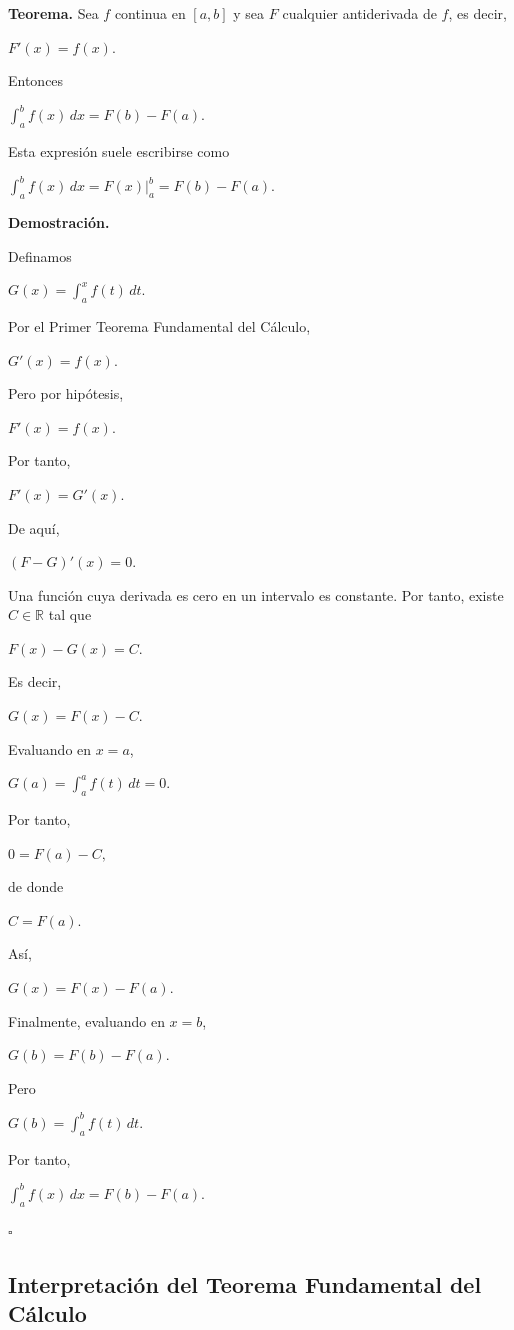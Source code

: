 \documentclass[12pt]{article}
\begin{document}
\textbf{Teorema.}
Sea $f$ continua en $[a,b]$ y sea $F$ cualquier antiderivada de $f$, es
decir,

$
F'(x)=f(x).
$

Entonces

$
\boxed{
\int_a^b f(x)\,dx
=
F(b)-F(a).
}
$

Esta expresión suele escribirse como

$
\boxed{
\int_a^b f(x)\,dx
=
\left.F(x)\right|_a^b
=
F(b)-F(a).
}
$

\textbf{Demostración.}

Definamos

$
G(x)
=
\int_a^x f(t)\,dt.
$

Por el Primer Teorema Fundamental del Cálculo,

$
G'(x)=f(x).
$

Pero por hipótesis,

$
F'(x)=f(x).
$

Por tanto,

$
F'(x)=G'(x).
$

De aquí,

$
(F-G)'(x)=0.
$

Una función cuya derivada es cero en un intervalo es constante. Por tanto,
existe $C\in\mathbb{R}$ tal que

$
F(x)-G(x)=C.
$

Es decir,

$
G(x)=F(x)-C.
$

Evaluando en $x=a$,

$
G(a)
=
\int_a^a f(t)\,dt
=
0.
$

Por tanto,

$
0=F(a)-C,
$

de donde

$
C=F(a).
$

Así,

$
G(x)=F(x)-F(a).
$

Finalmente, evaluando en $x=b$,

$
G(b)=F(b)-F(a).
$

Pero

$
G(b)
=
\int_a^b f(t)\,dt.
$

Por tanto,

$
\boxed{
\int_a^b f(x)\,dx
=
F(b)-F(a).
}
$

\hfill$\square$

\subsection*{Interpretación del Teorema Fundamental del Cálculo}
\end{document}
